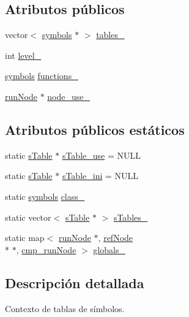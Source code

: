 \subsection*{Atributos públicos}
\begin{DoxyCompactItemize}
\item 
vector$<$ \hyperlink{classsymbolsTable}{symbols} $\ast$ $>$ \hyperlink{classsTable_a826fb8438b2b8475ef3328b0f0342fd2}{tables\-\_\-}
\item 
int \hyperlink{classsTable_a549ab9d5d0aad41d8289c693de39d328}{level\-\_\-}
\item 
\hyperlink{classsymbolsTable}{symbols} \hyperlink{classsTable_ac39633c58e4f659879f0292af0a3ea48}{functions\-\_\-}
\item 
\hyperlink{classrunNode}{run\-Node} $\ast$ \hyperlink{classsTable_a7f0eed1e3a2f06e80900d4034d7c7e25}{node\-\_\-use\-\_\-}
\end{DoxyCompactItemize}
\subsection*{Atributos públicos estáticos}
\begin{DoxyCompactItemize}
\item 
static \hyperlink{classsTable}{s\-Table} $\ast$ \hyperlink{classsTable_a80ddd01254b180d81bf0264e353bf7eb}{s\-Table\-\_\-use} = N\-U\-L\-L
\item 
static \hyperlink{classsTable}{s\-Table} $\ast$ \hyperlink{classsTable_a8c9904b43ec79f00b72d19b7e93fe80e}{s\-Table\-\_\-ini} = N\-U\-L\-L
\item 
static \hyperlink{classsymbolsTable}{symbols} \hyperlink{classsTable_ae3ed8713b34d93d63addf914333c9766}{class\-\_\-}
\item 
static vector$<$ \hyperlink{classsTable}{s\-Table} $\ast$ $>$ \hyperlink{classsTable_a4f5d3240bb31d3f77e72e81d4c18cdf4}{s\-Tables\-\_\-}
\item 
static map$<$ \hyperlink{classrunNode}{run\-Node} $\ast$, \hyperlink{classrefNode}{ref\-Node} \\*
$\ast$, \hyperlink{structcmp__runNode}{cmp\-\_\-run\-Node} $>$ \hyperlink{classsTable_a1f57f04be1d59b8c5ac8c58afc2a2687}{globals\-\_\-}
\end{DoxyCompactItemize}


\subsection{Descripción detallada}
Contexto de tablas de símbolos. 

